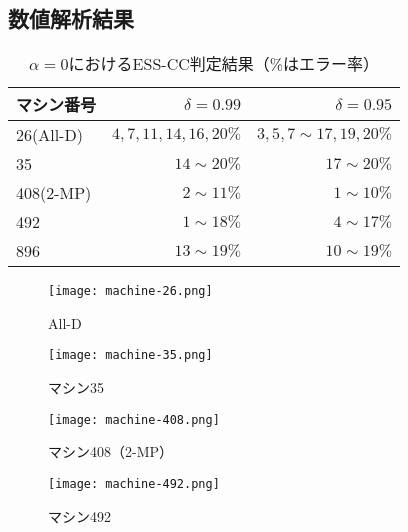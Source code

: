 \documentclass[submit]{ipsj}
\theoremstyle{definition}
\begin{document}
\subsection{数値解析結果} \label{sec:result}

\begin{table}[tb]
  \centering
  \caption{$\alpha = 0$におけるESS-CC判定結果（\%はエラー率）}
  \label{tab:ESS-CC-alpha-0}
  \begin{tabular}{l|rr} \hline\hline
    マシン番号 & $\delta = 0.99$ & $\delta = 0.95$ \\ \hline
    26(All-D) & $4, 7, 11, 14, 16, 20 \%$ & $3, 5, 7 \sim 17, 19, 20\%$ \\
    35 & $14 \sim 20\%$ & $17 \sim 20\%$ \\
    408(2-MP) & $2 \sim 11\%$ & $1 \sim 10\%$ \\
    492 & $1 \sim 18\%$ & $4 \sim 17\%$ \\
    896 & $13 \sim 19\%$ & $10 \sim 19\%$ \\ \hline
  \end{tabular}
\end{table}

\begin{figure}
  \centering
  \begin{minipage}{0.225\textwidth}
    \centering
    \texttt{[image: machine-26.png]}
    \caption{All-D}
    \label{fig:All-D}
  \end{minipage}
  \hfill
  \begin{minipage}{0.225\textwidth}
    \centering
    \texttt{[image: machine-35.png]}
    \caption{マシン35}
    \label{fig:machine-35}
  \end{minipage}
\end{figure}

\begin{figure}
  \centering
  \begin{minipage}{0.225\textwidth}
    \centering
    \texttt{[image: machine-408.png]}
    \caption{マシン408（2-MP）}
    \label{fig:2-MP}
  \end{minipage}
  \hfill
  \begin{minipage}{0.225\textwidth}
    \centering
    \texttt{[image: machine-492.png]}
    \caption{マシン492}
    \label{fig:machine-492}
  \end{minipage}
\end{figure}
\end{document}
